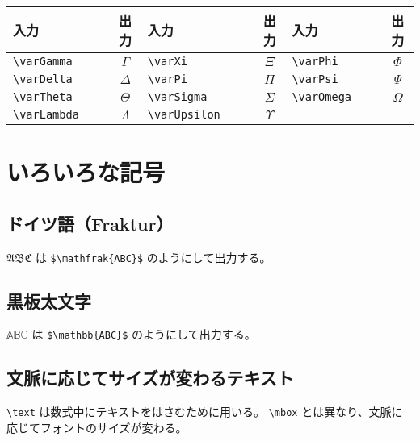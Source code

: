 \begin{longtable}{@{}lclclc@{}}
  入力                      & 出力                 & 入力                        & 出力                   & 入力                     & 出力                \\ \toprule
  \verb`\varGamma         ` & $\varGamma$          & \verb`\varXi              ` & $\varXi$               & \verb`\varPhi          ` & $\varPhi$           \\
  \verb`\varDelta`          & $\varDelta$          & \verb`\varPi`               & $\varPi$               & \verb`\varPsi`           & $\varPsi$           \\
  \verb`\varTheta`          & $\varTheta$          & \verb`\varSigma`            & $\varSigma$            & \verb`\varOmega`         & $\varOmega$         \\
  \verb`\varLambda`         & $\varLambda$         & \verb`\varUpsilon`          & $\varUpsilon$          &                          &                     \\
\end{longtable}
\section{いろいろな記号}
\subsection{ドイツ語（Fraktur）}
$\mathfrak{ABC}$ は \verb`$\mathfrak{ABC}$` のようにして出力する。
\subsection{黒板太文字}
$\mathbb{ABC}$ は \verb`$\mathbb{ABC}$` のようにして出力する。
\subsection{文脈に応じてサイズが変わるテキスト}
\verb`\text` は数式中にテキストをはさむために用いる。
\verb`\mbox` とは異なり、文脈に応じてフォントのサイズが変わる。

